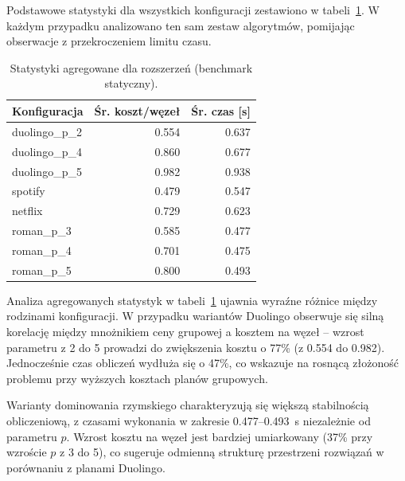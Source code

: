 Podstawowe statystyki dla wszystkich konfiguracji zestawiono w tabeli~\ref{tab:ext-overall-static}. W każdym przypadku analizowano ten sam zestaw algorytmów, pomijając obserwacje z przekroczeniem limitu czasu.

\begin{table}[H]
    \centering
    \caption{Statystyki agregowane dla rozszerzeń (benchmark statyczny).}
    \label{tab:ext-overall-static}
    \begin{tabular}{lrr}
        \toprule
        \textbf{Konfiguracja} & \textbf{Śr. koszt/węzeł} & \textbf{Śr. czas [s]} \\
        \midrule
        duolingo\_p\_2        & 0.554                    & 0.637                 \\
        duolingo\_p\_4        & 0.860                    & 0.677                 \\
        duolingo\_p\_5        & 0.982                    & 0.938                 \\
        spotify               & 0.479                    & 0.547                 \\
        netflix               & 0.729                    & 0.623                 \\
        roman\_p\_3           & 0.585                    & 0.477                 \\
        roman\_p\_4           & 0.701                    & 0.475                 \\
        roman\_p\_5           & 0.800                    & 0.493                 \\
    \end{tabular}
\end{table}

Analiza agregowanych statystyk w tabeli~\ref{tab:ext-overall-static} ujawnia wyraźne różnice między rodzinami konfiguracji. W przypadku wariantów Duolingo obserwuje się silną korelację między mnożnikiem ceny grupowej a kosztem na węzeł -- wzrost parametru z 2 do 5 prowadzi do zwiększenia kosztu o 77\% (z 0.554 do 0.982). Jednocześnie czas obliczeń wydłuża się o 47\%, co wskazuje na rosnącą złożoność problemu przy wyższych kosztach planów grupowych.

Warianty dominowania rzymskiego charakteryzują się większą stabilnością obliczeniową, z czasami wykonania w zakresie 0.477--0.493~s niezależnie od parametru $p$. Wzrost kosztu na węzeł jest bardziej umiarkowany (37\% przy wzroście $p$ z 3 do 5), co sugeruje odmienną strukturę przestrzeni rozwiązań w porównaniu z planami Duolingo.

